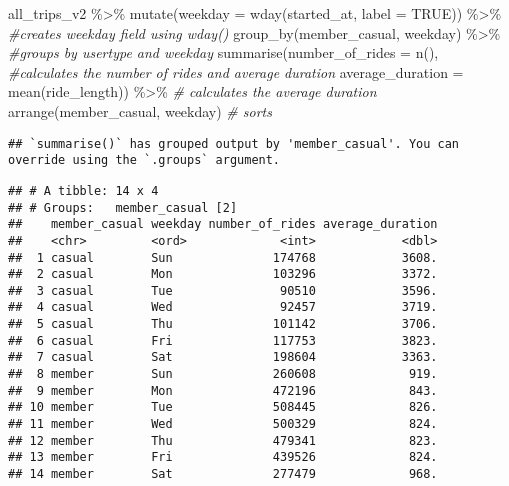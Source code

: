 \documentclass[
]{article}
\newenvironment{Shaded}{\begin{snugshade}}{\end{snugshade}}
\newcommand{\AttributeTok}[1]{\textcolor[rgb]{0.77,0.63,0.00}{#1}}
\newcommand{\CommentTok}[1]{\textcolor[rgb]{0.56,0.35,0.01}{\textit{#1}}}
\newcommand{\ConstantTok}[1]{\textcolor[rgb]{0.00,0.00,0.00}{#1}}
\newcommand{\FunctionTok}[1]{\textcolor[rgb]{0.00,0.00,0.00}{#1}}
\newcommand{\NormalTok}[1]{#1}
\newcommand{\SpecialCharTok}[1]{\textcolor[rgb]{0.00,0.00,0.00}{#1}}
\begin{document}
\begin{Shaded}
\begin{Highlighting}[]
\NormalTok{all\_trips\_v2 }\SpecialCharTok{\%\textgreater{}\%} 
  \FunctionTok{mutate}\NormalTok{(}\AttributeTok{weekday =} \FunctionTok{wday}\NormalTok{(started\_at, }\AttributeTok{label =} \ConstantTok{TRUE}\NormalTok{)) }\SpecialCharTok{\%\textgreater{}\%}  \CommentTok{\#creates weekday field using wday()}
  \FunctionTok{group\_by}\NormalTok{(member\_casual, weekday) }\SpecialCharTok{\%\textgreater{}\%}  \CommentTok{\#groups by usertype and weekday}
  \FunctionTok{summarise}\NormalTok{(}\AttributeTok{number\_of\_rides =} \FunctionTok{n}\NormalTok{(),          }\CommentTok{\#calculates the number of rides and average duration }
  \AttributeTok{average\_duration =} \FunctionTok{mean}\NormalTok{(ride\_length)) }\SpecialCharTok{\%\textgreater{}\%}         \CommentTok{\# calculates the average duration}
  \FunctionTok{arrange}\NormalTok{(member\_casual, weekday)                               }\CommentTok{\# sorts}
\end{Highlighting}
\end{Shaded}

\begin{verbatim}
## `summarise()` has grouped output by 'member_casual'. You can override using the `.groups` argument.
\end{verbatim}

\begin{verbatim}
## # A tibble: 14 x 4
## # Groups:   member_casual [2]
##    member_casual weekday number_of_rides average_duration
##    <chr>         <ord>             <int>            <dbl>
##  1 casual        Sun              174768            3608.
##  2 casual        Mon              103296            3372.
##  3 casual        Tue               90510            3596.
##  4 casual        Wed               92457            3719.
##  5 casual        Thu              101142            3706.
##  6 casual        Fri              117753            3823.
##  7 casual        Sat              198604            3363.
##  8 member        Sun              260608             919.
##  9 member        Mon              472196             843.
## 10 member        Tue              508445             826.
## 11 member        Wed              500329             824.
## 12 member        Thu              479341             823.
## 13 member        Fri              439526             824.
## 14 member        Sat              277479             968.
\end{verbatim}
\end{document}
